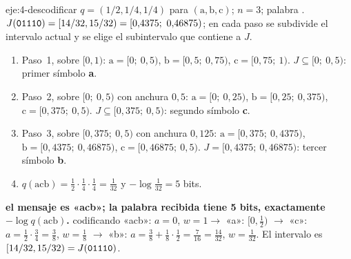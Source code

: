 \begin{solucion}{eje:4-descodificar}
\datos $q=(1/2,1/4,1/4)$ para $(\mathrm{a},\mathrm{b},\mathrm{c})$; $n=3$; palabra .
\planteamiento $J(\bin{01110})=[14/32,15/32)=[0{,}4375;\ 0{,}46875)$; en cada paso se subdivide el intervalo actual y se elige el subintervalo que contiene a $J$.
\pasos
\begin{enumerate}[label=\arabic*.]
  \item Paso~1, sobre $[0,1)$: $\mathrm{a}=[0;\ 0{,}5)$, $\mathrm{b}=[0{,}5;\ 0{,}75)$, $\mathrm{c}=[0{,}75;\ 1)$. $J\subseteq[0;\ 0{,}5)$: primer símbolo \textbf{a}.
  \item Paso~2, sobre $[0;\ 0{,}5)$ con anchura $0{,}5$: $\mathrm{a}=[0;\ 0{,}25)$, $\mathrm{b}=[0{,}25;\ 0{,}375)$, $\mathrm{c}=[0{,}375;\ 0{,}5)$. $J\subseteq[0{,}375;\ 0{,}5)$: segundo símbolo \textbf{c}.
  \item Paso~3, sobre $[0{,}375;\ 0{,}5)$ con anchura $0{,}125$: $\mathrm{a}=[0{,}375;\ 0{,}4375)$, $\mathrm{b}=[0{,}4375;\ 0{,}46875)$, $\mathrm{c}=[0{,}46875;\ 0{,}5)$. $J=[0{,}4375;\ 0{,}46875)$: tercer símbolo \textbf{b}.
  \item $q(\text{acb})=\tfrac12\cdot\tfrac14\cdot\tfrac14=\tfrac1{32}$ y $-\log\tfrac1{32}=5$ bits.
\end{enumerate}
\resultado \textbf{el mensaje es «acb»; la palabra recibida tiene 5 bits, exactamente $-\log q(\text{acb})$.}
\comprobacion codificando «acb»: $a=0$, $w=1\to$ «a»: $[0,\tfrac12)$ $\to$ «c»: $a=\tfrac12\cdot\tfrac34=\tfrac38$, $w=\tfrac18$ $\to$ «b»: $a=\tfrac38+\tfrac18\cdot\tfrac12=\tfrac7{16}=\tfrac{14}{32}$, $w=\tfrac1{32}$. El intervalo es $[14/32,15/32)=J(\textnormal{\texttt{01110}})$.
\end{solucion}

